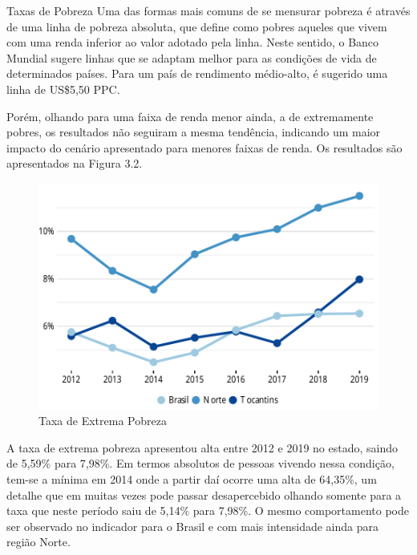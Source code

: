 \begin{smbox}[label={labelbox},nameref={Taxas de Pobreza}]{Taxas de Pobreza}
	Uma das formas mais comuns de se mensurar pobreza é através de uma linha de pobreza absoluta, que define como pobres aqueles que vivem com uma renda inferior ao valor adotado pela linha. Neste sentido, o Banco Mundial sugere linhas que se adaptam melhor para as condições de vida de determinados países. Para um país de rendimento médio-alto, é sugerido uma linha de US\$5,50 PPC.  
\end{smbox}
\par Porém, olhando para uma faixa de renda menor ainda, a de extremamente pobres, os resultados não seguiram a mesma tendência, indicando um maior impacto do cenário apresentado para menores faixas de renda. Os resultados são apresentados na Figura 3.2.
\begin{figure}[h]
	\caption{Taxa de Extrema Pobreza}
	\includegraphics{fig/taxa_expobreza.pdf}
\end{figure}
\par A taxa de extrema pobreza apresentou alta entre 2012 e 2019 no estado, saindo de 5,59\% para 7,98\%. Em termos absolutos de pessoas vivendo nessa condição, tem-se a mínima em 2014 onde a partir daí ocorre uma alta de 64,35\%, um detalhe que em muitas vezes pode passar desapercebido olhando somente para a taxa que neste período saiu de 5,14\% para 7,98\%. O mesmo comportamento pode ser observado no indicador para o Brasil e  com mais intensidade ainda para região Norte.

